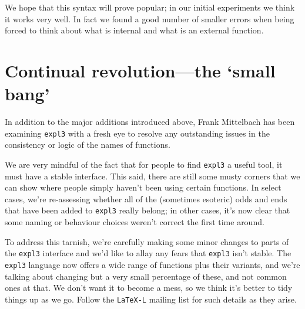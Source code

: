 \documentclass{ltnews}
\begin{document}
We hope that this syntax will prove popular; in our initial experiments we think it works very well. In fact we found a good number of smaller errors when being forced to think about what is internal and what is an external function.

\section{Continual revolution---the `small bang'}

In addition to the major additions introduced above, Frank Mittelbach has been examining \texttt{expl3} with a fresh eye to resolve any outstanding issues in the consistency or logic of the names of functions.

We are very mindful of the fact that for people to find \texttt{expl3} a useful tool, it must have a stable interface.
This said, there are still some musty corners that we can show where people simply haven't been using certain functions.
In select cases, we're re-assessing whether all of the (sometimes esoteric) odds and ends that have been added to \texttt{expl3} really belong; in other cases, it's now clear that some naming or behaviour choices weren't correct the first time around.

To address this tarnish, we're carefully making some minor changes to parts of the \texttt{expl3} interface and we'd like to allay any fears that \texttt{expl3} isn't stable.
The \texttt{expl3} language now offers a wide range of functions plus their variants, and we're talking about changing but a very small percentage of these, and not common ones at that.
We don't want it to become a mess, so we think it's better to tidy things up as we go.
Follow the \texttt{LaTeX-L} mailing list for such details as they arise.
\end{document}
